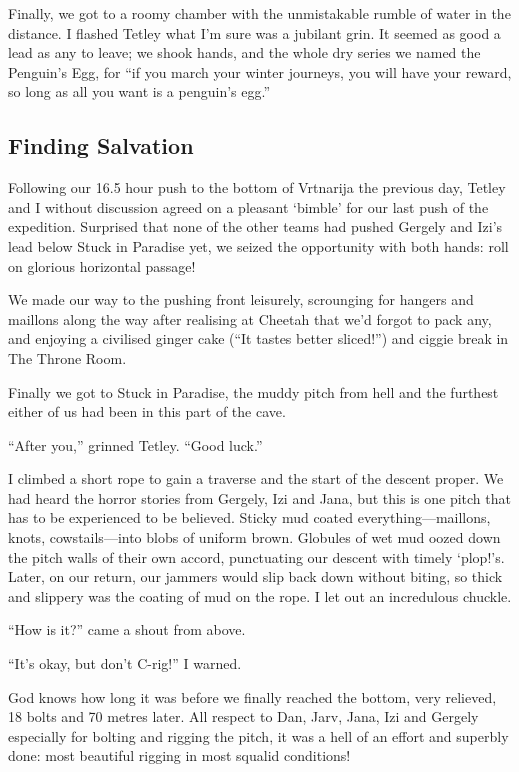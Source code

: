 Finally, we got to a roomy chamber with the unmistakable rumble of water
in the distance. I flashed Tetley what I'm sure was a jubilant grin. It
seemed as good a lead as any to leave; we shook hands, and the whole dry
series we named the Penguin's Egg, for ``if you march your winter
journeys, you will have your reward, so long as all you want is a
penguin's egg.''


\hypertarget{finding-salvation}{%
\subsection{Finding Salvation}\label{finding-salvation}}

Following our 16.5 hour push to the bottom of Vrtnarija the previous
day, Tetley and I without discussion agreed on a pleasant `bimble' for
our last push of the expedition. Surprised that none of the other teams
had pushed Gergely and Izi's lead below Stuck in Paradise yet, we seized
the opportunity with both hands: roll on glorious horizontal passage!

We made our way to the pushing front leisurely, scrounging for hangers
and maillons along the way after realising at Cheetah that we'd forgot
to pack any, and enjoying a civilised ginger cake (``It tastes better
sliced!'') and ciggie break in The Throne Room.

Finally we got to Stuck in Paradise, the muddy pitch from hell and the
furthest either of us had been in this part of the cave.

``After you,'' grinned Tetley. ``Good luck.''

I climbed a short rope to gain a traverse and the start of the descent
proper. We had heard the horror stories from Gergely, Izi and Jana, but
this is one pitch that has to be experienced to be believed. Sticky mud
coated everything---maillons, knots, cowstails---into blobs of uniform
brown. Globules of wet mud oozed down the pitch walls of their own
accord, punctuating our descent with timely `plop!'s. Later, on our
return, our jammers would slip back down without biting, so thick and
slippery was the coating of mud on the rope. I let out an incredulous
chuckle.

``How is it?'' came a shout from above.

``It's okay, but don't C-rig!'' I warned.

God knows how long it was before we finally reached the bottom, very
relieved, 18 bolts and 70 metres later. All respect to Dan, Jarv, Jana,
Izi and Gergely especially for bolting and rigging the pitch, it was a
hell of an effort and superbly done: most beautiful rigging in most
squalid conditions!


